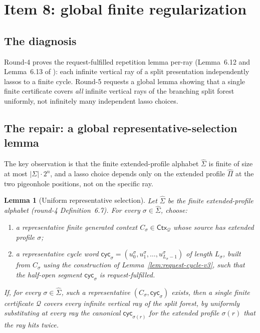 \documentclass[11pt]{article}
\newtheorem{lemma}[theorem]{Lemma}
\theoremstyle{definition}
\theoremstyle{remark}
\newcommand{\Ctx}{\mathsf{Ctx}}
\newcommand{\Q}{\mathcal{Q}}
\newcommand{\extProf}{\widehat\Pi}
\newcommand{\extSigma}{\widehat\Sigma}
\begin{document}
\section{Item 8: global finite regularization}
\label{sec:item8}

\subsection{The diagnosis}

Round-4 \cite{GPT55Repaired} proves the request-fulfilled
repetition lemma per-ray (Lemma~6.12 and Lemma~6.13 of
\cite{GPT55Repaired}): each infinite vertical ray of a split
presentation independently lassos to a finite cycle.  Round-5
\cite{GPT55Round5Review} requests a global lemma showing that a
single finite certificate covers \emph{all} infinite vertical rays
of the branching split forest uniformly, not infinitely many
independent lasso choices.

\subsection{The repair: a global representative-selection lemma}

The key observation is that the finite extended-profile alphabet
$\extSigma$ is finite of size at most $|\Sigma|\cdot 2^n$, and a
lasso choice depends only on the extended profile $\extProf$ at the
two pigeonhole positions, not on the specific ray.

\begin{lemma}[Uniform representative selection]\label{lem:global-rep}
Let $\extSigma$ be the finite extended-profile alphabet (round-4
Definition~6.7).  For every $\sigma\in\extSigma$, choose:
\begin{enumerate}[label=(\arabic*)]
\item a representative finite generated context
$C_\sigma\in\Ctx_\Q$ whose source has extended profile $\sigma$;
\item a representative cycle word
$\mathsf{cyc}_\sigma=(u_0^\sigma,u_1^\sigma,\ldots,u_{L_\sigma-1}^\sigma)$
of length $L_\sigma$, built from $C_\sigma$ using the construction
of Lemma~\ref{lem:request-cycle-v3}, such that the half-open
segment $\mathsf{cyc}_\sigma$ is request-fulfilled.
\end{enumerate}
If, for every $\sigma\in\extSigma$, such a representative
$(C_\sigma,\mathsf{cyc}_\sigma)$ exists, then a single finite
certificate $\Q$ covers every infinite vertical ray of the split
forest, by uniformly substituting at every ray the canonical
$\mathsf{cyc}_{\sigma(r)}$ for the extended profile $\sigma(r)$
that the ray hits twice.
\end{lemma}
\end{document}
